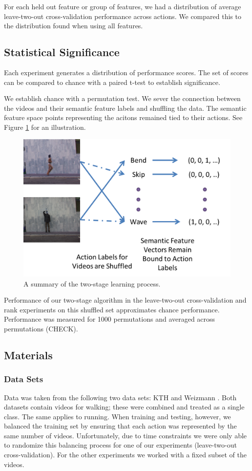 \documentclass{article}
\begin{document}
For each held out feature or group of features, we had a distribution of average leave-two-out cross-validation performance across actions.  We compared this to the distribution found when using all features.

\label{fcomp}

\subsection{Statistical Significance}
Each experiment generates a distribution of performance scores. The set of scores can be compared to chance with a paired t-test to establish significance.

We establish chance with a permutation test. We sever the connection between the videos and their semantic feature labels and shuffling the data. The semantic feature space points representing the acitons remained tied to their actions. See Figure \ref{st} for an illustration.

\begin{figure}[h]
  \centering
  \includegraphics[width=.4\linewidth]{shuffle}
  \caption{A summary of the two-stage learning process.}
  \label{st}
\end{figure}

Performance of our two-stage algorithm in the leave-two-out cross-validation and rank experiments on this shuffled set approximates chance performance. Performance was measured for 1000 permutations and averaged across permutations (CHECK).
\label{stats}

\subsection{Materials}
\subsubsection{Data Sets}
Data was taken from the following two data sets: KTH \cite{kth} and Weizmann \cite{weizmann}. Both datasets contain videos for walking; these were combined and treated as a single class. The same applies to running.  When training and testing, however, we balanced the training set by ensuring that each action was represented by the same number of videos. Unfortunately, due to time constraints we were only able to randomize this balancing process for one of our experiments (leave-two-out cross-validation). For the other experiments we worked with a fixed subset of the videos.
\end{document}
